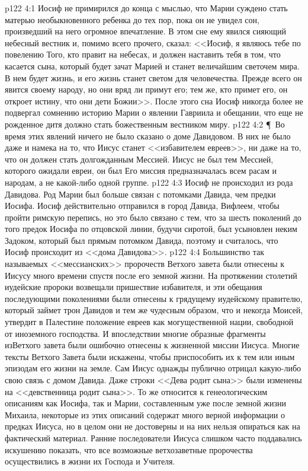 \vs p122 4:1 Иосиф не примирился до конца с мыслью, что Марии суждено стать матерью необыкновенного ребенка до тех пор, пока он не увидел сон, произведший на него огромное впечатление. В этом сне ему явился сияющий небесный вестник и, помимо всего прочего, сказал: <<Иосиф, я являюсь тебе по повелению Того, кто правит на небесах, и должен наставить тебя в том, что касается сына, который будет зачат Марией и станет величайшим светочем мира. В нем будет жизнь, и его жизнь станет светом для человечества. Прежде всего он явится своему народу, но они вряд ли примут его; тем же, кто примет его, он откроет истину, что они дети Божии>>. После этого сна Иосиф никогда более не подвергал сомнению историю Марии о явлении Гавриила и обещании, что еще не рожденное дитя должно стать божественным вестником миру.
\vs p122 4:2 \P\ Во время этих явлений ничего не было сказано о доме Давидовом. В них не было даже и намека на то, что Иисус станет <<избавителем евреев>>, ни даже на то, что он должен стать долгожданным Мессией. Иисус не был тем Мессией, которого ожидали евреи, он был  Его миссия предназначалась всем расам и народам, а не какой\hyp{}либо одной группе.
\vs p122 4:3 Иосиф не происходил из рода Давидова. Род Марии был больше связан с потомками Давида, чем предки Иосифа. Иосиф действительно отправился в город Давида, Вифлеем, чтобы пройти римскую перепись, но это было связано с тем, что за шесть поколений до того предок Иосифа по отцовской линии, будучи сиротой, был усыновлен неким Задоком, который был прямым потомком Давида, поэтому и считалось, что Иосиф происходит из <<дома Давидова>>.
\vs p122 4:4 Большинство так называемых <<мессианских>> пророчеств Ветхого завета были отнесены к Иисусу много времени спустя после его земной жизни. На протяжении столетий иудейские пророки возвещали пришествие избавителя, и эти обещания последующими поколениями были отнесены к грядущему иудейскому правителю, который займет трон Давидов и тем же чудесным образом, что и некогда Моисей, утвердит в Палестине положение евреев как могущественной нации, свободной от иноземного господства. И впоследствии многие образные фрагменты изВетхого завета были ошибочно отнесены к жизненной миссии Иисуса. Многие тексты Ветхого Завета были искажены, чтобы приспособить их к тем или иным эпизодам его жизни на земле. Сам Иисус однажды публично отрицал какую\hyp{}либо свою связь с домом Давида. Даже строки <<Дева родит сына>> были изменены на <<девственница родит сына>>. То же относится к генеологическим описаниям как Иосифа, так и Марии, составленным уже после земной жизни Михаила, некоторые из этих описаний содержат много верной информации о предках Иисуса, но в целом они не достоверны и на них нельзя опираться как на фактический материал. Ранние последователи Иисуса слишком часто поддавались искушению показать, что все возможные ветхозаветные пророчества осуществились в жизни их Господа и Учителя.
